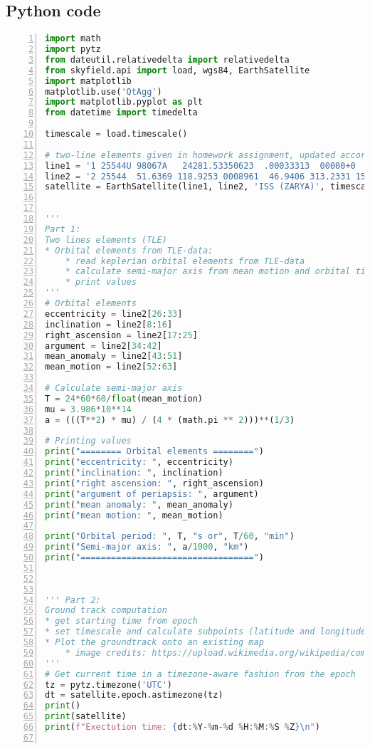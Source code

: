 \begin{appendices}

\section{Python code}
\label{sec:Appendix_A}

\begin{lstlisting}[frame=single, language=Python, numbers=left]
import math
import pytz
from dateutil.relativedelta import relativedelta
from skyfield.api import load, wgs84, EarthSatellite
import matplotlib
matplotlib.use('QtAgg')
import matplotlib.pyplot as plt
from datetime import timedelta

timescale = load.timescale()

# two-line elements given in homework assignment, updated according to email
line1 = '1 25544U 98067A   24281.53350623  .00033313  00000+0  60150-3 0  9991'
line2 = '2 25544  51.6369 118.9253 0008961  46.9406 313.2331 15.49376493475973'
satellite = EarthSatellite(line1, line2, 'ISS (ZARYA)', timescale)


''' 
Part 1: 
Two lines elements (TLE)
* Orbital elements from TLE-data:
    * read keplerian orbital elements from TLE-data
    * calculate semi-major axis from mean motion and orbital time
    * print values
'''
# Orbital elements
eccentricity = line2[26:33]
inclination = line2[8:16]
right_ascension = line2[17:25]
argument = line2[34:42]
mean_anomaly = line2[43:51]
mean_motion = line2[52:63]

# Calculate semi-major axis
T = 24*60*60/float(mean_motion)
mu = 3.986*10**14
a = (((T**2) * mu) / (4 * (math.pi ** 2)))**(1/3)

# Printing values
print("======== Orbital elements ========")
print("eccentricity: ", eccentricity)
print("inclination: ", inclination)
print("right ascension: ", right_ascension)
print("argument of periapsis: ", argument)
print("mean anomaly: ", mean_anomaly)
print("mean motion: ", mean_motion)

print("Orbital period: ", T, "s or", T/60, "min")
print("Semi-major axis: ", a/1000, "km")
print("==================================")



''' Part 2: 
Ground track computation
* get starting time from epoch
* set timescale and calculate subpoints (latitude and longitude)
* Plot the groundtrack onto an existing map 
    * image credits: https://upload.wikimedia.org/wikipedia/commons/2/23/Blue_Marble_2002.png 
'''
# Get current time in a timezone-aware fashion from the epoch
tz = pytz.timezone('UTC')
dt = satellite.epoch.astimezone(tz)
print()
print(satellite)
print(f"Exectution time: {dt:%Y-%m-%d %H:%M:%S %Z}\n")


\end{lstlisting}
\end{appendices}
